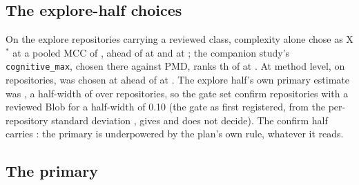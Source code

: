 \documentclass[11pt,a4paper]{article}
\newcommand{\madz}{modified $z \geq 3.5$}
\newcommand{\fitwidth}[1]{\resizebox{\ifdim\width>\textwidth\textwidth\else\width\fi}{!}{#1}}
\newcommand{\sig}[1]{\texttt{#1}}
\newcommand{\Xs}{X$^*$}
\begin{document}
\subsection{The explore-half choices}
\label{sec:explore}

On the \xClassRepos{} explore repositories carrying a reviewed class,
complexity alone chose \sig{\xClass} as \Xs{} at a pooled MCC of
\xClassMcc{}, ahead of \sig{\xClassSecond} at \xClassSecondMcc{} and
\sig{\xClassThird} at \xClassThirdMcc{}; the companion study's
\sig{cognitive\_max}, chosen there against PMD, ranks \xClassCogMaxRank{}th
of \xClassCandidates{} at \xClassCogMaxMcc{}. At method level, on
\xMethodRepos{} repositories, \sig{\xMethod} was chosen at \xMethodMcc{}
ahead of \sig{\xMethodSecond} at \xMethodSecondMcc{}. The explore half's own
primary estimate was \gateExploreEstimate{}, a half-width of
\gateHalfWidth{} over \gateExplorePositiveRepos{} repositories, so the gate
set \gateRequired{} confirm repositories with a reviewed Blob for a
half-width of 0.10 (the gate as first registered, from the per-repository
standard deviation \gateVOneS{}, gives \gateVOneRequired{} and does not
decide). The confirm half carries \primGateReposWithBlob{}: the primary is
underpowered by the plan's own rule, whatever it reads.

\subsection{The primary}
\label{sec:primary}

\begin{table}[t]
\centering
\caption{The primary read-out against MLCQ human Blob on the confirm half:
\primUniv{} reviewed classes, \primPos{} of them Blob, in \primRepos{}
repositories. Every arm is scored by \madz{} on every class of its
repository. Flagged and hits are pooled counts over the reviewed classes;
the paired difference is the pooled MCC of the arm minus that of \Xs{}, with
its 95\% percentile bootstrap interval over repositories.}
\label{tab:primary}
\small
\setlength{\tabcolsep}{4pt}
\fitwidth{}
\end{table}
\end{document}

